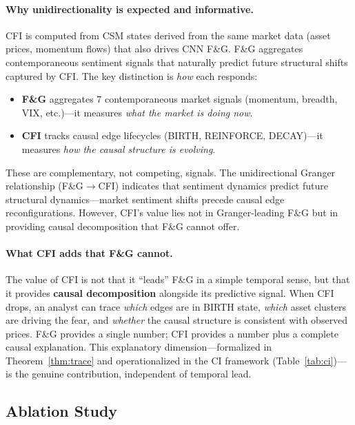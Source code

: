 \documentclass[11pt]{article}
\begin{document}
\paragraph{Why unidirectionality is expected and informative.} CFI is computed from CSM states derived from the same market data (asset prices, momentum flows) that also drives CNN F\&G. F\&G aggregates contemporaneous sentiment signals that naturally predict future structural shifts captured by CFI. The key distinction is \emph{how} each responds:
\begin{itemize}
\item \textbf{F\&G} aggregates 7 contemporaneous market signals (momentum, breadth, VIX, etc.)---it measures \emph{what the market is doing now}.
\item \textbf{CFI} tracks causal edge lifecycles (BIRTH, REINFORCE, DECAY)---it measures \emph{how the causal structure is evolving}.
\end{itemize}
These are complementary, not competing, signals. The unidirectional Granger relationship (F\&G$\to$CFI) indicates that sentiment dynamics predict future structural dynamics---market sentiment shifts precede causal edge reconfigurations. However, CFI's value lies not in Granger-leading F\&G but in providing causal decomposition that F\&G cannot offer.

\paragraph{What CFI adds that F\&G cannot.} The value of CFI is not that it ``leads'' F\&G in a simple temporal sense, but that it provides \textbf{causal decomposition} alongside its predictive signal. When CFI drops, an analyst can trace \emph{which} edges are in BIRTH state, \emph{which} asset clusters are driving the fear, and \emph{whether} the causal structure is consistent with observed prices. F\&G provides a single number; CFI provides a number plus a complete causal explanation. This explanatory dimension---formalized in Theorem~\ref{thm:trace} and operationalized in the CI framework (Table~\ref{tab:ci})---is the genuine contribution, independent of temporal lead.

\subsection{Ablation Study}
\label{sec:ablation}
\end{document}
